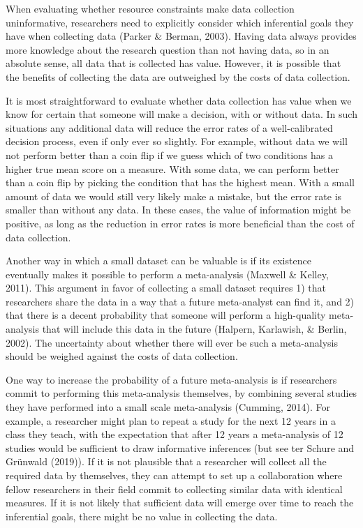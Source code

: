 \documentclass[
  english,
  ,jou, a4paper,floatsintext]{apa6}
\begin{document}
When evaluating whether resource constraints make data collection uninformative, researchers need to explicitly consider which inferential goals they have when collecting data (Parker \& Berman, 2003). Having data always provides more knowledge about the research question than not having data, so in an absolute sense, all data that is collected has value. However, it is possible that the benefits of collecting the data are outweighed by the costs of data collection.

It is most straightforward to evaluate whether data collection has value when we know for certain that someone will make a decision, with or without data. In such situations any additional data will reduce the error rates of a well-calibrated decision process, even if only ever so slightly. For example, without data we will not perform better than a coin flip if we guess which of two conditions has a higher true mean score on a measure. With some data, we can perform better than a coin flip by picking the condition that has the highest mean. With a small amount of data we would still very likely make a mistake, but the error rate is smaller than without any data. In these cases, the value of information might be positive, as long as the reduction in error rates is more beneficial than the cost of data collection.

Another way in which a small dataset can be valuable is if its existence eventually makes it possible to perform a meta-analysis (Maxwell \& Kelley, 2011). This argument in favor of collecting a small dataset requires 1) that researchers share the data in a way that a future meta-analyst can find it, and 2) that there is a decent probability that someone will perform a high-quality meta-analysis that will include this data in the future (Halpern, Karlawish, \& Berlin, 2002). The uncertainty about whether there will ever be such a meta-analysis should be weighed against the costs of data collection.

One way to increase the probability of a future meta-analysis is if researchers commit to performing this meta-analysis themselves, by combining several studies they have performed into a small scale meta-analysis (Cumming, 2014). For example, a researcher might plan to repeat a study for the next 12 years in a class they teach, with the expectation that after 12 years a meta-analysis of 12 studies would be sufficient to draw informative inferences (but see ter Schure and Grünwald (2019)). If it is not plausible that a researcher will collect all the required data by themselves, they can attempt to set up a collaboration where fellow researchers in their field commit to collecting similar data with identical measures. If it is not likely that sufficient data will emerge over time to reach the inferential goals, there might be no value in collecting the data.
\end{document}
